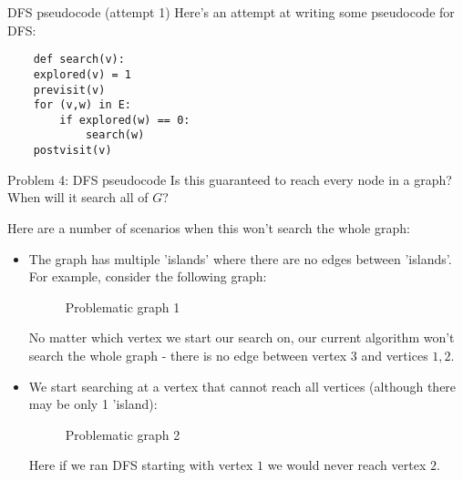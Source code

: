 \documentclass{article}
\begin{document}
\begin{strategy}{DFS pseudocode (attempt 1)}
    Here's an attempt at writing some pseudocode for DFS:
    \begin{lstlisting}
    def search(v):
	explored(v) = 1
	previsit(v)
	for (v,w) in E:
		if explored(w) == 0:
			search(w)
	postvisit(v)
\end{lstlisting}
\end{strategy}
\begin{problem}{Problem 4: DFS pseudocode}
    Is this guaranteed to reach every node in a graph? When will it search all of $G$?
\end{problem}
Here are a number of scenarios when this won't search the whole graph:
\begin{itemize}
    \item The graph has multiple 'islands' where there are no edges between 'islands'. For example, consider the following graph:
    \begin{figure}[h]
        \centering
        \caption{Problematic graph 1}
        \label{fig:my_label}
    \end{figure}
    
    No matter which vertex we start our search on, our current algorithm won't search the whole graph - there is no edge between vertex $3$ and vertices $1, 2$.
    \item We start searching at a vertex that cannot reach all vertices (although there may be only 1 'island):
        \begin{figure}[h]
        \centering
        \caption{Problematic graph 2}
        \label{fig:my_label}
    \end{figure}

    Here if we ran DFS starting with vertex $1$ we would never reach vertex $2$.
\end{itemize}
\end{document}
